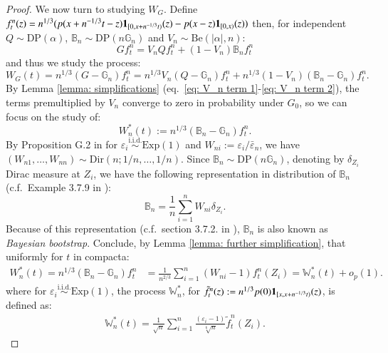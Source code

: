 \begin{proof}
We now turn to studying $W_{\scriptscriptstyle{G}}$. Define $f_t^n(z) = n^{1/3} (p(x+n^{-1/3}t-z)\mathbf{1}_{[0, x+n^{-1/3}t)}(z) - p(x-z)\mathbf{1}_{[0, x)}(z) )$
then, for independent $Q \sim \text{DP}(\alpha)$, $\mathbb{B}_n \sim \text{DP}(n \mathbb{G}_n)$ and $V_n \sim \text{Be}(|\alpha|, n)$:
\[
G f_t^n = V_n Q f_t^n + (1-V_n) \mathbb{B}_n f_t^n
\]
and thus we study the process:
\[
W_{\scriptscriptstyle{G}}(t) = n^{1/3}(G-\mathbb{G}_n)f_t^n = n^{1/3} V_n (Q-\mathbb{G}_n)f_t^n + n^{1/3}(1-V_n)(\mathbb{B}_n-\mathbb{G}_n)f_t^n.
\]
By Lemma \ref{lemma: simplifications} (eq.\ \eqref{eq: V_n term 1}-\eqref{eq: V_n term 2}), the terms premultiplied by $V_n$ converge to zero in probability under $G_0$, so we can focus on the study of:
\[
W_n^*(t) := n^{1/3} (\mathbb{B}_n-\mathbb{G}_n) f_t^n.
\]
By Proposition G.2 in \cite{4} for \( \varepsilon_i \overset{\text{i.i.d.}}{\sim} \text{Exp}(1) \) and \( W_{ni} := \varepsilon_i / \bar{\varepsilon}_n \), we have \( (W_{n1}, \ldots, W_{nn}) \sim \text{Dir}(n; 1/n, \dots, 1/n) \). Since \( \mathbb{B}_n \sim \text{DP}(n \mathbb{G}_n) \), denoting by $\delta_{Z_i}$ Dirac measure at $Z_i$, we have the following representation in distribution of $\mathbb{B}_n$ (c.f.\ Example 3.7.9 in \cite{5}):
	\[
	\mathbb{B}_n = \frac{1}{n} \sum_{i=1}^n W_{ni} \delta_{Z_i}.
	\]
Because of this representation (c.f.\ section 3.7.2. in \cite{5}), $\mathbb{B}_n$ is also known as \textit{Bayesian bootstrap}. Conclude, by Lemma \ref{lemma: further simplification}, that uniformly for $t$ in compacta:
\begin{align}\label{eq: W_n^* simplified}
	W_n^*(t) = n^{1/3}(\mathbb{B}_n - \mathbb{G}_n)f_t^n &= \frac{1}{n^{2/3}} \sum_{i=1}^n (W_{ni}-1) f_t^n(Z_i) = \mathbb{W}_n^*(t) + o_p(1) .
\end{align}
where for \( \varepsilon_i \overset{\text{i.i.d.}}{\sim} \text{Exp}(1) \), the process $\mathbb{W}_n^*$, for $\tilde{f}_t^n(z) := n^{1/3} p(0) \mathbf{1}_{[x, x+n^{-1/3}t)}(z)$, is defined as:
\begin{align}\label{eq: mathbbW star process}
    \mathbb{W}_n^*(t) = \frac{1}{\sqrt{n}} \sum_{i=1}^n \frac{(\varepsilon_i-1)}{\sqrt[6]{n}} \tilde{f}_t^n(Z_i).
\end{align}


\end{proof}
